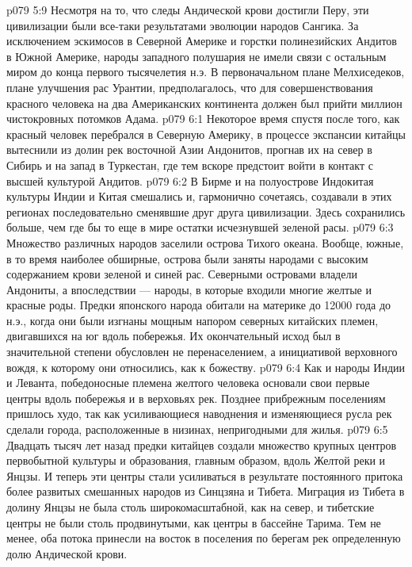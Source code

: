 \vs p079 5:9 Несмотря на то, что следы Андической крови достигли Перу, эти цивилизации были все\hyp{}таки результатами эволюции народов Сангика. За исключением эскимосов в Северной Америке и горстки полинезийских Андитов в Южной Америке, народы западного полушария не имели связи с остальным миром до конца первого тысячелетия н.э. В первоначальном плане Мелхиседеков, плане улучшения рас Урантии, предполагалось, что для совершенствования красного человека на два Американских континента должен был прийти миллион чистокровных потомков Адама.
\vs p079 6:1 Некоторое время спустя после того, как красный человек перебрался в Северную Америку, в процессе экспансии китайцы вытеснили из долин рек восточной Азии Андонитов, прогнав их на север в Сибирь и на запад в Туркестан, где тем вскоре предстоит войти в контакт с высшей культурой Андитов.
\vs p079 6:2 В Бирме и на полуострове Индокитая культуры Индии и Китая смешались и, гармонично сочетаясь, создавали в этих регионах последовательно сменявшие друг друга цивилизации. Здесь сохранились больше, чем где бы то еще в мире остатки исчезнувшей зеленой расы.
\vs p079 6:3 Множество различных народов заселили острова Тихого океана. Вообще, южные, в то время наиболее обширные, острова были заняты народами с высоким содержанием крови зеленой и синей рас. Северными островами владели Андониты, а впоследствии --- народы, в которые входили многие желтые и красные роды. Предки японского народа обитали на материке до 12000 года до н.э., когда они были изгнаны мощным напором северных китайских племен, двигавшихся на юг вдоль побережья. Их окончательный исход был в значительной степени обусловлен не перенаселением, а инициативой верховного вождя, к которому они относились, как к божеству.
\vs p079 6:4 Как и народы Индии и Леванта, победоносные племена желтого человека основали свои первые центры вдоль побережья и в верховьях рек. Позднее прибрежным поселениям пришлось худо, так как усиливающиеся наводнения и изменяющиеся русла рек сделали города, расположенные в низинах, непригодными для жилья.
\vs p079 6:5 Двадцать тысяч лет назад предки китайцев создали множество крупных центров первобытной культуры и образования, главным образом, вдоль Желтой реки и Янцзы. И теперь эти центры стали усиливаться в результате постоянного притока более развитых смешанных народов из Синцзяна и Тибета. Миграция из Тибета в долину Янцзы не была столь широкомасштабной, как на север, и тибетские центры не были столь продвинутыми, как центры в бассейне Тарима. Тем не менее, оба потока принесли на восток в поселения по берегам рек определенную долю Андической крови.
